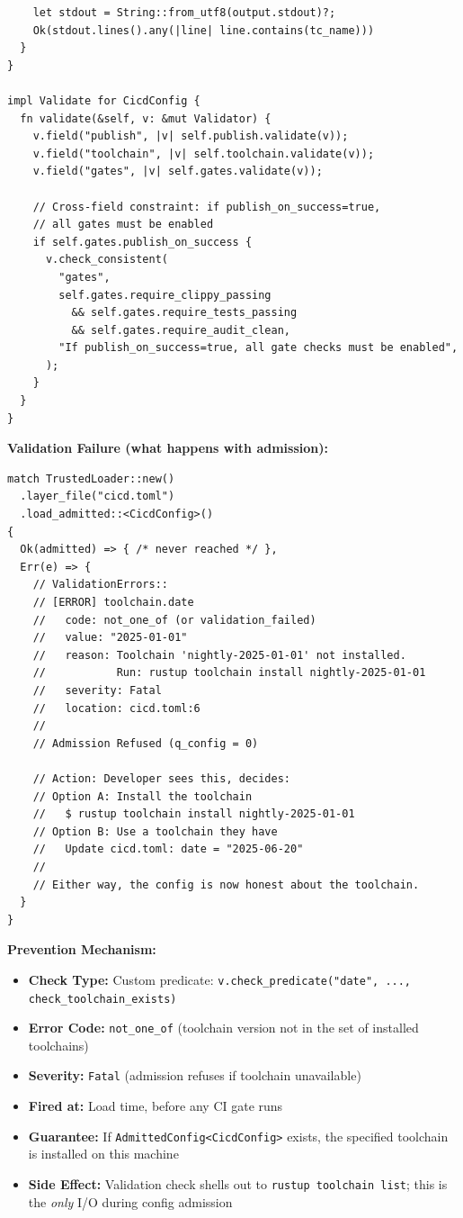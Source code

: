 \documentclass[11pt,a4paper]{article}
\begin{document}
\begin{lstlisting}
    let stdout = String::from_utf8(output.stdout)?;
    Ok(stdout.lines().any(|line| line.contains(tc_name)))
  }
}

impl Validate for CicdConfig {
  fn validate(&self, v: &mut Validator) {
    v.field("publish", |v| self.publish.validate(v));
    v.field("toolchain", |v| self.toolchain.validate(v));
    v.field("gates", |v| self.gates.validate(v));

    // Cross-field constraint: if publish_on_success=true,
    // all gates must be enabled
    if self.gates.publish_on_success {
      v.check_consistent(
        "gates",
        self.gates.require_clippy_passing
          && self.gates.require_tests_passing
          && self.gates.require_audit_clean,
        "If publish_on_success=true, all gate checks must be enabled",
      );
    }
  }
}
\end{lstlisting}

\textbf{Validation Failure (what happens with admission):}

\begin{lstlisting}
match TrustedLoader::new()
  .layer_file("cicd.toml")
  .load_admitted::<CicdConfig>()
{
  Ok(admitted) => { /* never reached */ },
  Err(e) => {
    // ValidationErrors::
    // [ERROR] toolchain.date
    //   code: not_one_of (or validation_failed)
    //   value: "2025-01-01"
    //   reason: Toolchain 'nightly-2025-01-01' not installed.
    //           Run: rustup toolchain install nightly-2025-01-01
    //   severity: Fatal
    //   location: cicd.toml:6
    //
    // Admission Refused (q_config = 0)

    // Action: Developer sees this, decides:
    // Option A: Install the toolchain
    //   $ rustup toolchain install nightly-2025-01-01
    // Option B: Use a toolchain they have
    //   Update cicd.toml: date = "2025-06-20"
    //
    // Either way, the config is now honest about the toolchain.
  }
}
\end{lstlisting}

\textbf{Prevention Mechanism:}
\begin{itemize}
  \item \textbf{Check Type:} Custom predicate: \texttt{v.check\_predicate("date", ..., check\_toolchain\_exists)}
  \item \textbf{Error Code:} \texttt{not\_one\_of} (toolchain version not in the set of installed toolchains)
  \item \textbf{Severity:} \texttt{Fatal} (admission refuses if toolchain unavailable)
  \item \textbf{Fired at:} Load time, before any CI gate runs
  \item \textbf{Guarantee:} If \texttt{AdmittedConfig<CicdConfig>} exists, the specified toolchain is installed on this machine
  \item \textbf{Side Effect:} Validation check shells out to \texttt{rustup toolchain list}; this is the \emph{only} I/O during config admission
\end{itemize}
\end{document}
